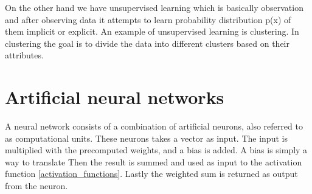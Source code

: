 On the other hand we have unsupervised learning which is basically observation and after observing data it attempts to learn probability distribution p(x) of them implicit or explicit. An example of unsupervised learning is clustering. In clustering the goal is to divide the data into different clusters based on their attributes. \parencite{goodfellow_deep_2016}

\section{Artificial neural networks}
\label{artificial_neural_networks}
% 
% 



A neural network consists of a combination of artificial neurons, also referred to as computational units. These neurons takes a vector as input. The input is multiplied with the precomputed weights, and a bias is added. A bias is simply a way to translate  Then the result is summed and used as input to the activation function \ref{activation_functions}. Lastly the weighted sum is returned as output from the neuron. \cite{_cs231n_????} \cite{_multi-layer_????}



